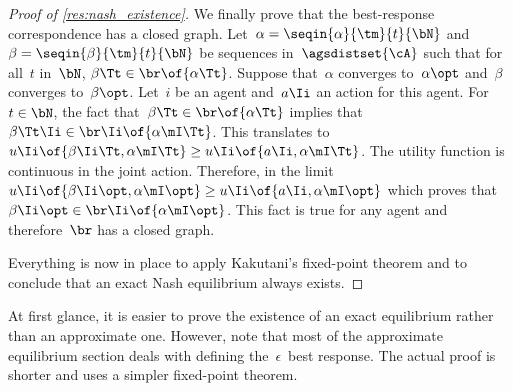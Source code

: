 \begin{proof}[Proof of \cref{res:nash_existence}]
We finally prove that the best-response correspondence has a closed graph.
Let~\(\alpha = \seqin{\alpha}{\tm}{t}{\bN}\) and~\(\beta = \seqin{\beta}{\tm}{t}{\bN}\) be sequences in~\(\agsdistset{\cA}\) such that for all~\(t\) in~\(\bN\), \(\beta\Tt \in \br \of {\alpha\Tt}\).
Suppose that~\(\alpha\) converges to~\(\alpha\opt\) and~\(\beta\) converges to~\(\beta\opt\).
Let~\(i\) be an agent and~\(a\Ii\) an action for this agent.
For~\(t \in \bN\), the fact that~\(\beta\Tt \in \br \of {\alpha\Tt}\) implies that~\(\beta\Tt\Ii \in \br\Ii \of {\alpha\mI\Tt}\).
This translates to~\(u\Ii \of {\beta\Ii\Tt, \alpha\mI\Tt} \ge u\Ii \of {a\Ii, \alpha\mI\Tt}\).
The utility function is continuous in the joint action.
Therefore, in the limit~\(u\Ii \of {\beta\Ii\opt, \alpha\mI\opt} \ge u\Ii \of {a\Ii, \alpha\mI\opt}\) which proves that~\(\beta\Ii\opt \in \br\Ii \of{\alpha\mI\opt}\).
This fact is true for any agent and therefore~\(\br\) has a closed graph.

Everything is now in place to apply Kakutani's fixed-point theorem and to conclude that an exact Nash equilibrium always exists.
\end{proof}

At first glance, it is easier to prove the existence of an exact equilibrium rather than an approximate one.
However, note that most of the approximate equilibrium section deals with defining the~\(\epsilon\)~best response.
The actual proof is shorter and uses a simpler fixed-point theorem.
